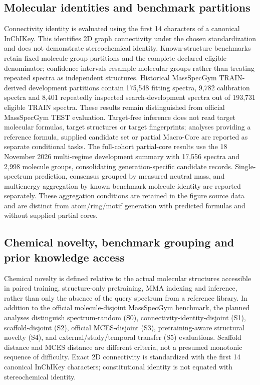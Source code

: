 \documentclass[11pt]{article}
\begin{document}
\subsection*{Molecular identities and benchmark partitions}
Connectivity identity is evaluated using the first 14 characters of a canonical InChIKey. This identifies 2D graph connectivity under the chosen standardization and does not demonstrate stereochemical identity. Known-structure benchmarks retain fixed molecule-group partitions and the complete declared eligible denominator; confidence intervals resample molecular groups rather than treating repeated spectra as independent structures. Historical MassSpecGym TRAIN-derived development partitions contain 175,548 fitting spectra, 9,782 calibration spectra and 8,401 repeatedly inspected search-development spectra out of 193,731 eligible TRAIN spectra. These results remain distinguished from official MassSpecGym TEST evaluation. Target-free inference does not read target molecular formulas, target structures or target fingerprints; analyses providing a reference formula, supplied candidate set or partial Macro-Core are reported as separate conditional tasks. The full-cohort partial-core results use the 18 November 2026 multi-regime development summary with 17,556 spectra and 2,998 molecule groups, consolidating generation-specific candidate records. Single-spectrum prediction, consensus grouped by measured neutral mass, and multienergy aggregation by known benchmark molecule identity are reported separately. These aggregation conditions are retained in the figure source data and are distinct from atom/ring/motif generation with predicted formulas and without supplied partial cores.

\subsection*{Chemical novelty, benchmark grouping and prior knowledge access}
Chemical novelty is defined relative to the actual molecular structures accessible in paired training, structure-only pretraining, MMA indexing and inference, rather than only the absence of the query spectrum from a reference library. In addition to the official molecule-disjoint MassSpecGym benchmark, the planned analyses distinguish spectrum-random (S0), connectivity-identity-disjoint (S1), scaffold-disjoint (S2), official MCES-disjoint (S3), pretraining-aware structural novelty (S4), and external/study/temporal transfer (S5) evaluations. Scaffold distance and MCES distance are different criteria, not a presumed monotonic sequence of difficulty. Exact 2D connectivity is standardized with the first 14 canonical InChIKey characters; constitutional identity is not equated with stereochemical identity.
\end{document}
